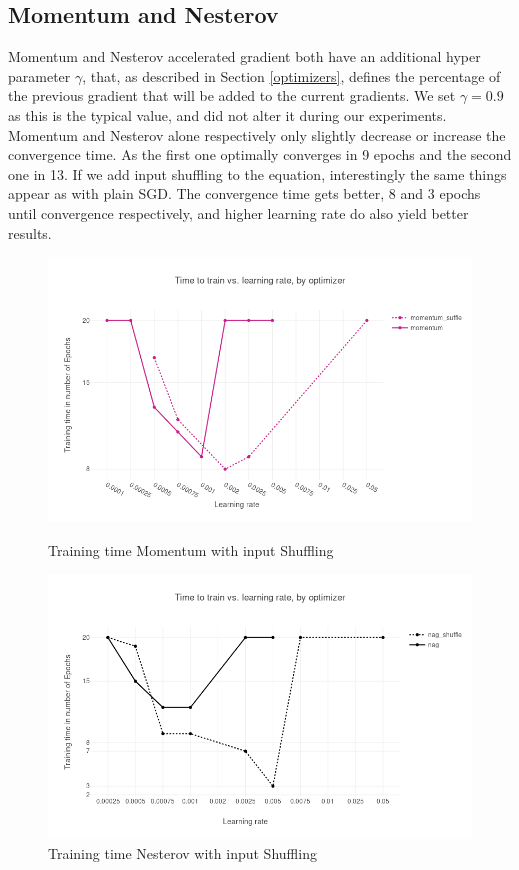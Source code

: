 \subsection{Momentum and Nesterov}
Momentum and Nesterov accelerated gradient both have an additional hyper parameter $\gamma$, that, as described in Section \ref{optimizers}, defines the percentage of the previous gradient that will be added to the current gradients. We set $\gamma = 0.9$ as this is the typical value, and did not alter it during our experiments. Momentum and Nesterov alone respectively only slightly decrease or increase the convergence time. As the first one optimally converges in 9 epochs and the second one in 13. If we add input shuffling to the equation, interestingly the same things appear as with plain SGD. The convergence time gets better, 8 and 3 epochs until convergence respectively, and higher learning rate do also yield better results. 
\begin{figure}[h]
\centering
\begin{minipage}{.5\textwidth}
  \centering
  	\includegraphics[scale=0.3]{images/results_mom_shuffle} 
    \caption{Training time  Momentum with input Shuffling}
    \label{fig:results_mom}
  \label{fig:test1}
\end{minipage}%
\begin{minipage}{.5\textwidth}
  \centering
	\includegraphics[scale=0.3]{images/results_nag_shuffle} 
    \caption{Training time  Nesterov with input Shuffling}
    \label{fig:results_nag}
\end{minipage}
\end{figure}
